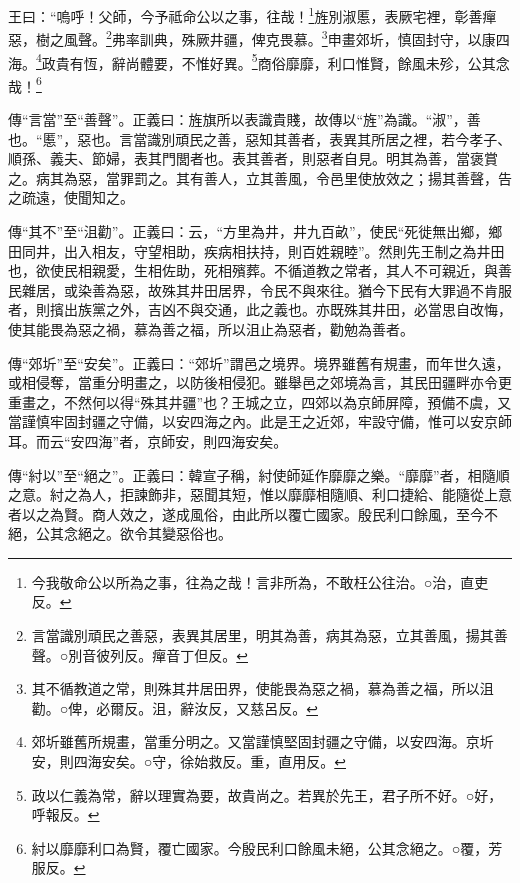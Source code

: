 王曰：“嗚呼！父師，今予祗命公以之事，往哉！\footnote{今我敬命公以所為之事，往為之哉！言非所為，不敢枉公往治。○治，直吏反。}旌別淑慝，表厥宅裡，彰善癉惡，樹之風聲。\footnote{言當識別頑民之善惡，表異其居里，明其為善，病其為惡，立其善風，揚其善聲。○別音彼列反。癉音丁但反。}弗率訓典，殊厥井疆，俾克畏慕。\footnote{其不循教道之常，則殊其井居田界，使能畏為惡之禍，慕為善之福，所以沮勸。○俾，必爾反。沮，辭汝反，又慈呂反。}申畫郊圻，慎固封守，以康四海。\footnote{郊圻雖舊所規畫，當重分明之。又當謹慎堅固封疆之守備，以安四海。京圻安，則四海安矣。○守，徐始救反。重，直用反。}政貴有恆，辭尚體要，不惟好異。\footnote{政以仁義為常，辭以理實為要，故貴尚之。若異於先王，君子所不好。○好，呼報反。}商俗靡靡，利口惟賢，餘風未殄，公其念哉！\footnote{紂以靡靡利口為賢，覆亡國家。今殷民利口餘風未絕，公其念絕之。○覆，芳服反。}


{\noindent\zhuan{}\fzbyks 傳“言當”至“善聲”。正義曰：旌旗所以表識貴賤，故傳以“旌”為識。“淑”，善也。“慝”，惡也。言當識別頑民之善，惡知其善者，表異其所居之裡，若今孝子、順孫、義夫、節婦，表其門閭者也。表其善者，則惡者自見。明其為善，當褒賞之。病其為惡，當罪罰之。其有善人，立其善風，令邑里使放效之；揚其善聲，告之疏遠，使聞知之。 \par}

{\noindent\zhuan{}\fzbyks 傳“其不”至“沮勸”。正義曰：云，“方里為井，井九百畝”，使民“死徙無出鄉，鄉田同井，出入相友，守望相助，疾病相扶持，則百姓親睦”。然則先王制之為井田也，欲使民相親愛，生相佐助，死相殯葬。不循道教之常者，其人不可親近，與善民雜居，或染善為惡，故殊其井田居界，令民不與來往。猶今下民有大罪過不肯服者，則擯出族黨之外，吉凶不與交通，此之義也。亦既殊其井田，必當思自改悔，使其能畏為惡之禍，慕為善之福，所以沮止為惡者，勸勉為善者。 \par}

{\noindent\zhuan{}\fzbyks 傳“郊圻”至“安矣”。正義曰：“郊圻”謂邑之境界。境界雖舊有規畫，而年世久遠，或相侵奪，當重分明畫之，以防後相侵犯。雖舉邑之郊境為言，其民田疆畔亦令更重畫之，不然何以得“殊其井疆”也？王城之立，四郊以為京師屏障，預備不虞，又當謹慎牢固封疆之守備，以安四海之內。此是王之近郊，牢設守備，惟可以安京師耳。而云“安四海”者，京師安，則四海安矣。 \par}

{\noindent\zhuan{}\fzbyks 傳“紂以”至“絕之”。正義曰：韓宣子稱，紂使師延作靡靡之樂。“靡靡”者，相隨順之意。紂之為人，拒諫飾非，惡聞其短，惟以靡靡相隨順、利口捷給、能隨從上意者以之為賢。商人效之，遂成風俗，由此所以覆亡國家。殷民利口餘風，至今不絕，公其念絕之。欲令其變惡俗也。 \par}

